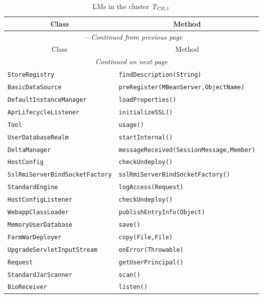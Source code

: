 \begin{center}
\begin{longtable}{ll}
\caption{LMs in the cluster $\mathit{T}_{\mathit{CB},1}$}\\
\toprule\multicolumn{1}{c}{Class}&\multicolumn{1}{c}{Method}\\\midrule
\endfirsthead

\multicolumn{2}{c}{\tablename\ \thetable{}---\textit{Continued from previous page}} \\\midrule
\multicolumn{1}{c}{Class}&\multicolumn{1}{c}{Method}\\\midrule
\endhead
\multicolumn{2}{c}{\textit{Continued on next page}}\\\midrule
\endfoot
\bottomrule
\endlastfoot
\lstinline/StoreRegistry/&{\lstinline/findDescription(String)/}\\
\lstinline/BasicDataSource/&{\lstinline/preRegister(MBeanServer,ObjectName)/}\\
\lstinline/DefaultInstanceManager/&{\lstinline/loadProperties()/}\\
\lstinline/AprLifecycleListener/&{\lstinline/initializeSSL()/}\\
\lstinline/Tool/&{\lstinline/usage()/}\\
\lstinline/UserDatabaseRealm/&{\lstinline/startInternal()/}\\
\lstinline/DeltaManager/&{\lstinline/messageReceived(SessionMessage,Member)/}\\
\lstinline/HostConfig/&{\lstinline/checkUndeploy()/}\\
\lstinline/SslRmiServerBindSocketFactory/&{\lstinline/sslRmiServerBindSocketFactory()/}\\
\lstinline/StandardEngine/&{\lstinline/logAccess(Request)/}\\
\lstinline/HostConfigListener/&{\lstinline/checkUndeploy()/}\\
\lstinline/WebappClassLoader/&{\lstinline/publishEntryInfo(Object)/}\\
\lstinline/MemoryUserDatabase/&{\lstinline/save()/}\\
\lstinline/FarmWarDeployer/&{\lstinline/copy(File,File)/}\\
\lstinline/UpgradeServletInputStream/&{\lstinline/onError(Throwable)/}\\
\lstinline/Request/&{\lstinline/getUserPrincipal()/}\\
\lstinline/StandardJarScanner/&{\lstinline/scan()/}\\
\lstinline/BioReceiver/&{\lstinline/listen()/}\\

\end{longtable}
\end{center}
